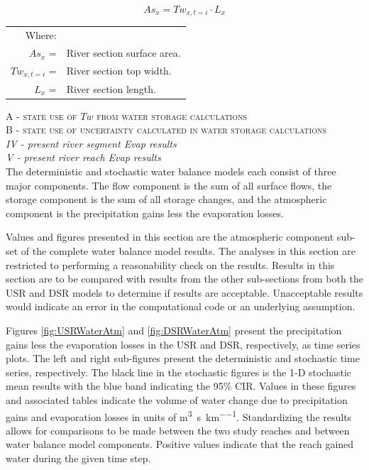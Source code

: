 \begin{linenumbers}
\begin{equation}
	As_x= Tw_{x,t=i} \cdot L_x
	\label{eq:surfacearea}
\end{equation}
\begin{tabular}{rl}
	Where: & \\
	$As_x$ = & River section surface area.\\
	$Tw_{x,t=i}$ = & River section top width.\\
	$L_x$ = & River section length.\\
\end{tabular}

\textsc{A - state use of $Tw$ from water storage calculations}\\

\textsc{B - state use of uncertainty calculated in water storage calculations}\\

\emph{IV - present river segment Evap results}\\

\emph{V - present river reach Evap results}\\

The deterministic and stochastic water balance models each consist of three major components.  The flow component is the sum of all surface flows, the storage component is the sum of all storage changes, and the atmospheric component is the precipitation gains less the evaporation losses.

Values and figures presented in this section are the atmospheric component sub-set of the complete water balance model results.  The analyses in this section are restricted to performing a reasonability check on the results.  Results in this section are to be compared with results from the other sub-sections from both the USR and DSR models to determine if results are acceptable.  Unacceptable results would indicate an error in the computational code or an underlying assumption.

Figures \ref{fig:USRWaterAtm} and \ref{fig:DSRWaterAtm} present the precipitation gains less the evaporation losses in the USR and DSR, respectively, as time series plots.  The left and right sub-figures present the deterministic and stochastic time series, respectively.  The black line in the stochastic figures is the 1-D stochastic mean results with the blue band indicating the 95\% CIR.  Values in these figures and associated tables indicate the volume of water change due to precipitation gains and evaporation losses in units of \si{\cubic\meter\per\second\per\kilo\meter}.  Standardizing the results allows for comparisons to be made between the two study reaches and between water balance model components.  Positive values indicate that the reach gained water during the given time step.


\end{linenumbers}
